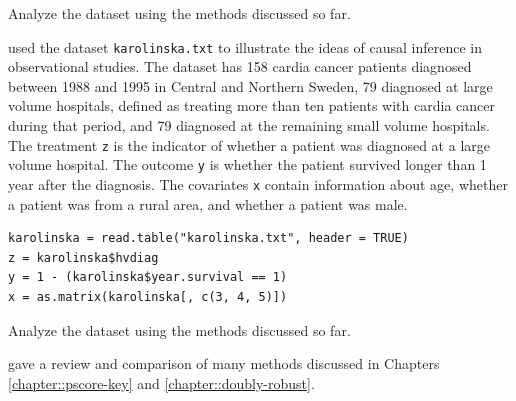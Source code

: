 \begin{HomeworkProblem}\label{exr:12-4}


Analyze the dataset  using the methods discussed so far.



\end{HomeworkProblem}

\begin{HomeworkProblem}\label{exr:12-5}

 \citet{rubin2008objective} used the dataset \texttt{karolinska.txt} to illustrate the ideas of causal inference in observational studies.
 The dataset has 158 cardia cancer patients diagnosed between 1988 and 1995 in Central and Northern Sweden, 79 diagnosed at large volume hospitals, defined as treating more than ten patients with cardia cancer during that period, and 79 diagnosed at the remaining small volume hospitals. The treatment \texttt{z}  is the indicator of whether a patient was diagnosed at a large volume hospital. The outcome \texttt{y} is whether the patient survived longer than 1 year after the diagnosis. The covariates \texttt{x} contain information about age, whether a patient was from a rural area, and whether a patient was male.

\begin{lstlisting}
karolinska = read.table("karolinska.txt", header = TRUE)
z = karolinska$hvdiag
y = 1 - (karolinska$year.survival == 1)
x = as.matrix(karolinska[, c(3, 4, 5)])
\end{lstlisting}


Analyze the dataset using the methods discussed so far.



\end{HomeworkProblem}

\begin{HomeworkProblem}\label{exr:12-6}

 \citet{lunceford2004stratification} gave a review and comparison of many methods discussed in Chapters \ref{chapter::pscore-key} and \ref{chapter::doubly-robust}.



\end{HomeworkProblem}
